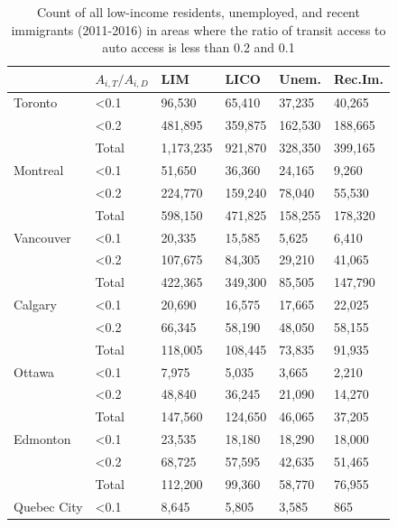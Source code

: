 \documentclass[11 pt, letterpaper]{article}
\begin{document}
{\begin{table}[H]
	\vspace{2mm}
	\centering
	\renewcommand{\arraystretch}{0.75} %
	\caption{Count of all low-income residents, unemployed, and recent immigrants (2011-2016) in areas where the ratio of transit access to auto access is less than 0.2 and 0.1}
	\label{tab_ratio}
	\begin{tabular}{ll|llll}
			& $A_{i,T} / A_{i,D}$ & LIM     & LICO    & Unem.   & Rec.Im. \\ \hline
Toronto     & \textless 0.1  & 96,530    & 65,410    & 37,235  & 40,265  \\
& \textless 0.2   & 481,895   & 359,875   & 162,530 & 188,665 \\
& Total & 1,173,235 & 921,870   & 328,350 & 399,165 \\ \hline
Montreal    & \textless 0.1  & 51,650    & 36,360    & 24,165  & 9,260   \\
& \textless 0.2   & 224,770   & 159,240   & 78,040  & 55,530  \\
& Total & 598,150   & 471,825   & 158,255 & 178,320 \\ \hline
Vancouver   & \textless 0.1  & 20,335    & 15,585    & 5,625   & 6,410   \\
&\textless 0.2   & 107,675   & 84,305    & 29,210  & 41,065  \\
& Total & 422,365   & 349,300   & 85,505  & 147,790 \\ \hline
Calgary     & \textless 0.1  & 20,690    & 16,575    & 17,665  & 22,025  \\
& \textless 0.2   & 66,345    & 58,190    & 48,050  & 58,155  \\
& Total & 118,005   & 108,445   & 73,835  & 91,935  \\ \hline
Ottawa      & \textless 0.1  & 7,975     & 5,035     & 3,665   & 2,210   \\
& \textless 0.2   & 48,840    & 36,245    & 21,090  & 14,270  \\
& Total & 147,560   & 124,650   & 46,065  & 37,205  \\ \hline
Edmonton    & \textless 0.1  & 23,535    & 18,180    & 18,290  & 18,000  \\
& \textless 0.2   & 68,725    & 57,595    & 42,635  & 51,465  \\
& Total & 112,200   & 99,360    & 58,770  & 76,955  \\ \hline
Quebec City & \textless 0.1 & 8,645     & 5,805     & 3,585   & 865     \\

\end{tabular}
\end{table}}
\end{document}
